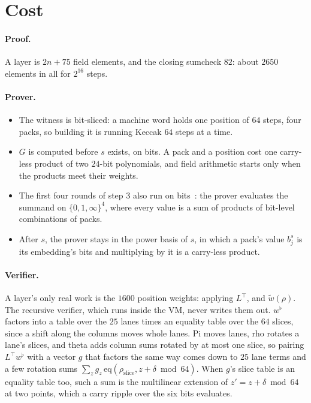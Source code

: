 \documentclass[11pt]{article}
\newcommand{\eq}{\mathrm{eq}}
\newcommand{\mle}[1]{\widetilde{#1}}
\begin{document}
\section{Cost}

\paragraph{Proof.} A layer is $2n + 75$ field elements, and the closing sumcheck $82$: about $2650$ elements in all for $2^{16}$ steps.

\paragraph{Prover.}
\begin{itemize}
  \item The witness is bit-sliced: a machine word holds one position of $64$ steps, four packs, so building it is running Keccak $64$ steps at a time.
  \item $G$ is computed before $s$ exists, on bits. A pack and a position cost one carry-less product of two $24$-bit polynomials, and field arithmetic starts only when the products meet their weights.
  \item The first four rounds of step 3 also run on bits~\cite{hashcaster}: the prover evaluates the summand on $\{0, 1, \infty\}^4$, where every value is a sum of products of bit-level combinations of packs.
  \item After $s$, the prover stays in the power basis of $s$, in which a pack's value $b^s_j$ is its embedding's bits and multiplying by it is a carry-less product.
\end{itemize}

\paragraph{Verifier.} A layer's only real work is the $1600$ position weights: applying $L^\top$, and $\mle{w}(\rho)$. The recursive verifier, which runs inside the VM, never writes them out. $w^\flat$ factors into a table over the $25$ lanes times an equality table over the $64$ slices, since a shift along the columns moves whole lanes. Pi moves lanes, rho rotates a lane's slices, and theta adds column sums rotated by at most one slice, so pairing $L^\top w^\flat$ with a vector $g$ that factors the same way comes down to $25$ lane terms and a few rotation sums $\sum_z g_z\, \eq(\rho_{\mathrm{slice}}, z + \delta \bmod 64)$. When $g$'s slice table is an equality table too, such a sum is the multilinear extension of $z' = z + \delta \bmod 64$ at two points, which a carry ripple over the six bits evaluates.
\end{document}

